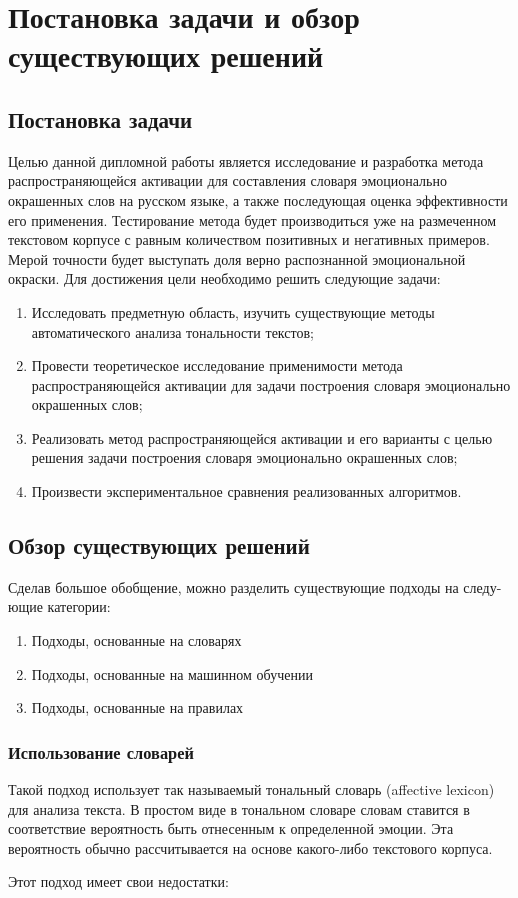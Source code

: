 \chapter{Постановка задачи и обзор существующих решений}
\section{Постановка задачи}
Целью данной дипломной работы является исследование и разработка метода
распространяющейся активации для составления словаря эмоционально окрашенных
слов на русском языке, а также последующая оценка эффективности его применения.
Тестирование метода будет производиться уже на размеченном текстовом корпусе
с равным количеством позитивных и негативных примеров. Мерой точности будет
выступать доля верно распознанной эмоциональной окраски. Для достижения цели
необходимо решить следующие задачи:
\begin{enumerate}
  \item Исследовать предметную область, изучить существующие методы
    автоматического анализа тональности текстов;
  \item Провести теоретическое исследование применимости метода
    распространяющейся активации для задачи построения словаря эмоционально
    окрашенных слов;
  \item Реализовать метод распространяющейся активации и его варианты с целью
    решения задачи построения словаря эмоционально окрашенных слов;
  \item Произвести экспериментальное сравнения реализованных алгоритмов.
\end{enumerate}

\section{Обзор существующих решений}
Сделав большое обобщение, можно разделить существующие подходы на следу-
ющие категории:

\begin{enumerate}
  \item Подходы, основанные на словарях
  \item Подходы, основанные на машинном обучении
  \item Подходы, основанные на правилах
\end{enumerate} 

\subsection{Использование словарей}
Такой подход использует так называемый тональный словарь (affective lexicon)
для анализа текста. В простом виде в тональном словаре словам ставится в
соответствие вероятность быть отнесенным к определенной эмоции. Эта
вероятность обычно рассчитывается на основе какого-либо текстового корпуса.

Этот подход имеет свои недостатки:


\FloatBarrier

